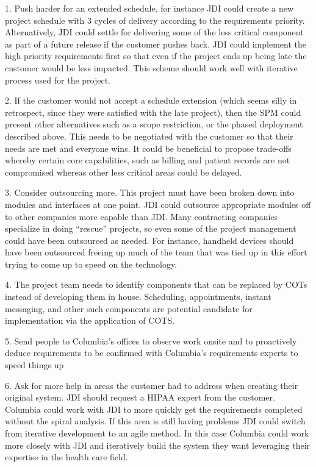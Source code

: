\documentclass[11pt]{article}
\begin{document}
1.  Push harder for an extended schedule, for instance JDI could create a new project schedule with
3 cycles of delivery according to the requirements priority.  Alternatively, JDI could settle for
delivering some of the less critical component as part of a future release if the customer pushes
back.  JDI could implement the high priority requirements first so that even if the project ends up
being late the customer would be less impacted.  This scheme should work well with iterative process
used for the project.

2.  If the customer would not accept a schedule extension (which seems silly in retrospect, since
they were satisfied with the late project), then the SPM could present other alternatives such as a
scope restriction, or the phased deployment described above.  This needs to be negotiated with the
customer so that their needs are met and everyone wins.  It could be beneficial to propose
trade-offs whereby certain core capabilities, such as billing and patient records are not
compromised whereas other less critical areas could be delayed.

3.  Consider outsourcing more.  This project must have been broken down into modules and interfaces
at one point.  JDI could outsource appropriate modules off to other companies more capable than JDI.
Many contracting companies specialize in doing “rescue” projects, so even some of the project
management could have been outsourced as needed.  For instance, handheld devices should have been
outsourced freeing up much of the team that was tied up in this effort trying to come up to speed on
the technology.

4.  The project team needs to identify components that can be replaced by COTs instead of developing
them in house.  Scheduling, appointments, instant messaging, and other such components are potential
candidate for implementation via the application of COTS.

5.  Send people to Columbia’s offices to observe work onsite and to proactively deduce requirements
to be confirmed with Columbia’s requirements experts to speed things up

6.  Ask for more help in areas the customer had to address when creating their original system.  JDI
should request a HIPAA expert from the customer.  Columbia could work with JDI to more quickly get
the requirements completed without the spiral analysis.  If this area is still having problems JDI
could switch from iterative development to an agile method.  In this case Columbia could work more
closely with JDI and iteratively build the system they want leveraging their expertise in the health
care field.
\end{document}
